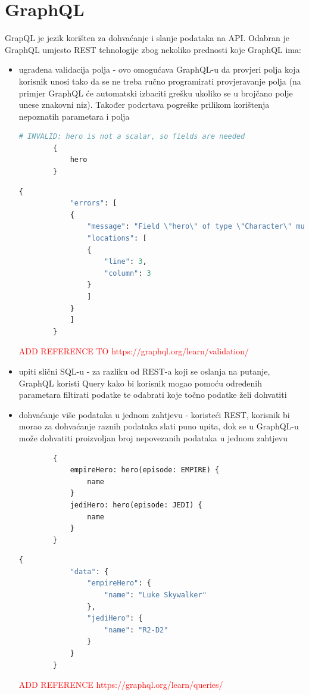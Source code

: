 \documentclass[zavrsnirad]{fer}
\begin{document}
\section{GraphQL}
GrapQL je jezik korišten za dohvaćanje i slanje podataka na API. Odabran je GraphQL umjesto REST tehnologije zbog nekoliko prednosti koje GraphQL ima:
 \begin{itemize}
 	\item ugrađena validacija polja - ovo omogućava GraphQL-u da provjeri polja koja korisnik unosi tako da se ne treba ručno programirati provjeravanje polja (na primjer GraphQL će automatski izbaciti grešku ukoliko se u brojčano polje unese znakovni niz). Također podcrtava pogreške prilikom korištenja nepoznatih parametara i polja
 	\begin{lstlisting}[language=GraphQL]
 		# INVALID: hero is not a scalar, so fields are needed
 		{
 			hero
 		}
 	\end{lstlisting}
 	\begin{lstlisting}[language=GraphQL]
 		{
 			"errors": [
 			{
 				"message": "Field \"hero\" of type \"Character\" must have a selection of subfields. Did you mean \"hero { ... }\"?",
 				"locations": [
 				{
 					"line": 3,
 					"column": 3
 				}
 				]
 			}
 			]
 		}
 	\end{lstlisting}
    \textcolor{red}{ADD REFERENCE TO https://graphql.org/learn/validation/}
 	\item upiti slični SQL-u - za razliku od REST-a koji se oslanja na putanje, GraphQL koristi Query kako bi korisnik mogao pomoću određenih parametara filtirati podatke te odabrati koje točno podatke želi dohvatiti
 	\item dohvaćanje više podataka u jednom zahtjevu - koristeći REST, korisnik bi morao za dohvaćanje raznih podataka slati puno upita, dok se u GraphQL-u može dohvatiti proizvoljan broj nepovezanih podataka u jednom zahtjevu
 	\begin{lstlisting}
 		{
 			empireHero: hero(episode: EMPIRE) {
 				name
 			}
 			jediHero: hero(episode: JEDI) {
 				name
 			}
 		}
 	\end{lstlisting}
 	\begin{lstlisting}[language=GraphQL]
 		{
 			"data": {
 				"empireHero": {
 					"name": "Luke Skywalker"
 				},
 				"jediHero": {
 					"name": "R2-D2"
 				}
 			}
 		}
 	\end{lstlisting}
 	\textcolor{red}{ADD REFERENCE https://graphql.org/learn/queries/}
 \end{itemize}
\end{document}
